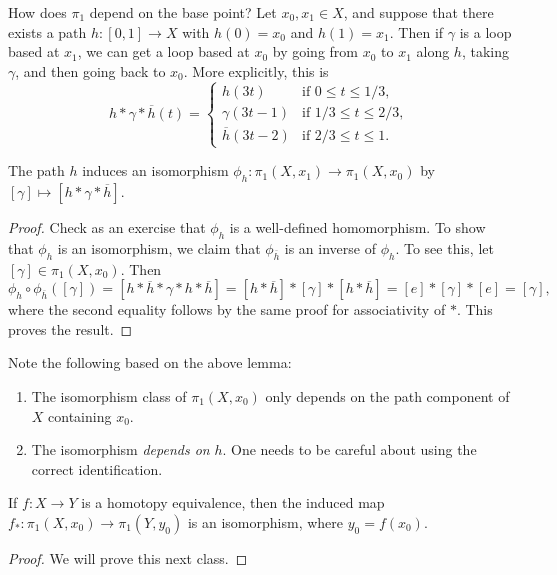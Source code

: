 \begin{remark}
  How does $\pi_1$ depend on the base point? Let
  $x_0, x_1 \in X$, and suppose that there
  exists a path $h : [0, 1] \to X$ with
  $h(0) = x_0$ and $h(1) = x_1$. Then if $\gamma$ is a
  loop based at $x_1$, we can get a loop based at $x_0$
  by going from $x_0$ to $x_1$ along $h$, taking
  $\gamma$, and then going back to $x_0$. More
  explicitly, this is
  \[
    h * \gamma * \overline{h}(t) =
    \begin{cases}
      h(3t) & \text{if } 0 \le t \le 1 / 3, \\
      \gamma(3t - 1) & \text{if } 1 / 3 \le t \le 2 / 3, \\
      \overline{h}(3t - 2) & \text{if } 2 / 3 \le t \le 1.
    \end{cases}
  \]
\end{remark}

\begin{lemma}
  The path $h$ induces an isomorphism
  $\phi_h : \pi_1(X, x_1) \to \pi_1(X, x_0)$
  by $[\gamma] \mapsto [h * \gamma * \overline{h}]$.
\end{lemma}

\begin{proof}
  Check as an exercise that $\phi_h$ is a well-defined
  homomorphism.
  To show that $\phi_h$ is an isomorphism, we claim
  that $\phi_{\overline{h}}$ is an inverse of $\phi_h$.
  To see this, let $[\gamma] \in \pi_1(X, x_0)$. Then
  \[
    \phi_h \circ \phi_{\overline{h}}([\gamma])
    = [h * \overline{h} * \gamma * h * \overline{h}]
    = [h * \overline{h}] * [\gamma] * [h * \overline{h}]
    = [e] * [\gamma] * [e]
    = [\gamma],
  \]
  where the second equality follows by the same
  proof for associativity of $*$. This proves the result.
\end{proof}

\begin{remark}
  Note the following based on the above lemma:
  \begin{enumerate}
    \item The isomorphism class of $\pi_1(X, x_0)$
      only depends on the path component of $X$
      containing $x_0$.
    \item The isomorphism \emph{depends on} $h$.
      One needs to be careful about using
      the correct identification.
  \end{enumerate}
\end{remark}

\begin{theorem}
  If $f : X \to Y$ is a homotopy equivalence, then
  the induced map
  $f_* : \pi_1(X, x_0) \to \pi_1(Y, y_0)$ is an
  isomorphism, where $y_0 = f(x_0)$.
\end{theorem}

\begin{proof}
  We will prove this next class.
\end{proof}
